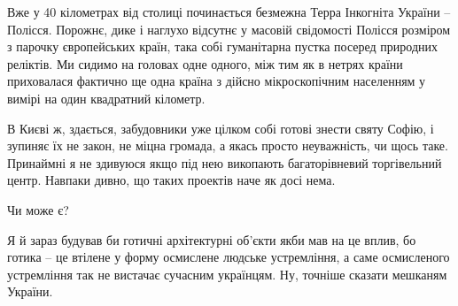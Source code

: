 Вже у 40 кілометрах від столиці починається безмежна Терра Інкогніта України –
Полісся. Порожнє, дике і наглухо відсутнє у масовій свідомості Полісся розміром
з парочку європейських країн, така собі гуманітарна пустка посеред природних
реліктів. Ми сидимо на головах одне одного, між тим як в нетрях країни
приховалася фактично ще одна країна з дійсно мікроскопічним населенням у вимірі
на один квадратний кілометр.

В Києві ж, здається, забудовники уже цілком собі готові знести святу Софію, і
зупиняє їх не закон, не міцна громада, а якась просто неуважність, чи щось
таке. Принаймні я не здивуюся якщо під нею викопають багаторівневий
торгівельний центр. Навпаки дивно, що таких проектів наче як досі нема.

Чи може є? 

Я й зараз будував би готичні архітектурні об'єкти якби мав на це вплив, бо
готика – це втілене у форму осмислене людське устремління, а саме осмисленого
устремління так не вистачає сучасним українцям. Ну, точніше сказати мешканям
України.


